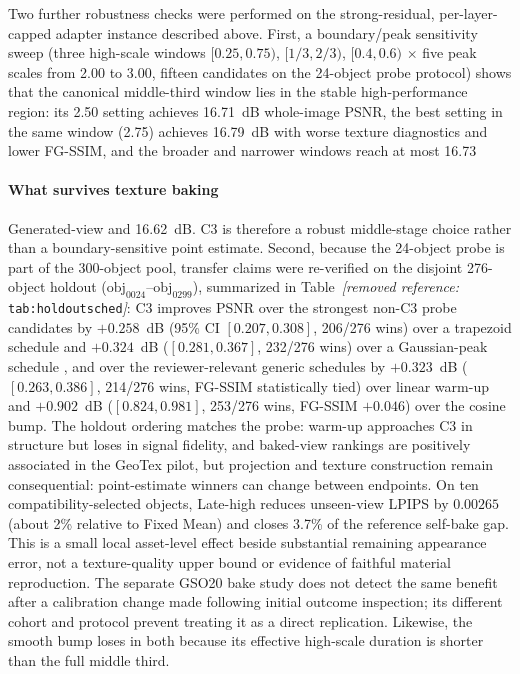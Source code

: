 \documentclass[times,twocolumn,final]{elsarticle}
\providecommand{\DIFadd}[1]{{\protect\color{blue} \sf #1}} %
\providecommand{\DIFdel}[1]{{\protect\color{red} \scriptsize #1}} %
\providecommand{\DIFaddbegin}{} %
\providecommand{\DIFaddend}{} %
\providecommand{\DIFdelbegin}{} %
\providecommand{\DIFdelend}{} %
\begin{document}
\DIFdelbegin \DIFdel{Two further robustness checks were performed on the strong-residual, per-layer-capped adapter instance described above. First, a boundary/peak sensitivity sweep (three high-scale windows $[0.25,0.75)$, $[1/3,2/3)$, $[0.4,0.6)$ $\times$ five peak scales from 2.00 to 3.00, fifteen candidates on the 24-object probe protocol) shows that the canonical middle-third window lies in the stable high-performance region: its 2.50 setting achieves 16.71~dB whole-image PSNR, the best setting in the same window (2.75) achieves 16.79~dB with worse texture diagnostics and lower FG-SSIM, and the broader and narrower windows reach at most 16.73 }\DIFdelend \DIFaddbegin \paragraph{What survives texture baking}
\DIFadd{Generated-view }\DIFaddend and \DIFdelbegin \DIFdel{16.62~dB. C3 is therefore a robust middle-stage choice rather than a boundary-sensitive point estimate. Second, because the 24-object probe is part of the 300-object pool, transfer claims were re-verified on the disjoint 276-object holdout ($\mathrm{obj}_{0024}$--$\mathrm{obj}_{0299}$), summarized in Table~\textit{[removed reference: }\texttt{tab:holdoutsched}\textit{]}: C3 improves PSNR over the strongest non-C3 probe candidates by $+0.258$~dB (95\% CI $[0.207,0.308]$, 206/276 wins) over a trapezoid schedule and $+0.324$~dB ($[0.281,0.367]$, 232/276 wins) over a Gaussian-peak schedule , and over the reviewer-relevant generic schedules by $+0.323$~dB ($[0.263,0.386]$, 214/276 wins, FG-SSIM statistically tied) over linear warm-up and $+0.902$~dB ($[0.824,0.981]$, 253/276 wins, FG-SSIM $+0.046$) over the cosine bump.
The holdout ordering matches the probe: warm-up approaches C3 in structure but loses in signal fidelity, and }\DIFdelend \DIFaddbegin \DIFadd{baked-view rankings are positively associated in the GeoTex pilot, but projection and texture construction remain consequential: point-estimate winners can change between endpoints. On ten compatibility-selected objects, Late-high reduces unseen-view LPIPS by $0.00265$ (about 2\% relative to Fixed Mean) and closes 3.7\% of the reference self-bake gap. This is a small local asset-level effect beside substantial remaining appearance error, not a texture-quality upper bound or evidence of faithful material reproduction. The separate GSO20 bake study does not detect the same benefit after a calibration change made following initial outcome inspection; its different cohort and protocol prevent treating it as a direct replication. Likewise, }\DIFaddend the \DIFdelbegin \DIFdel{smooth bump loses in both because its effective high-scale duration is shorter than the full middle third. }%
\end{document}
